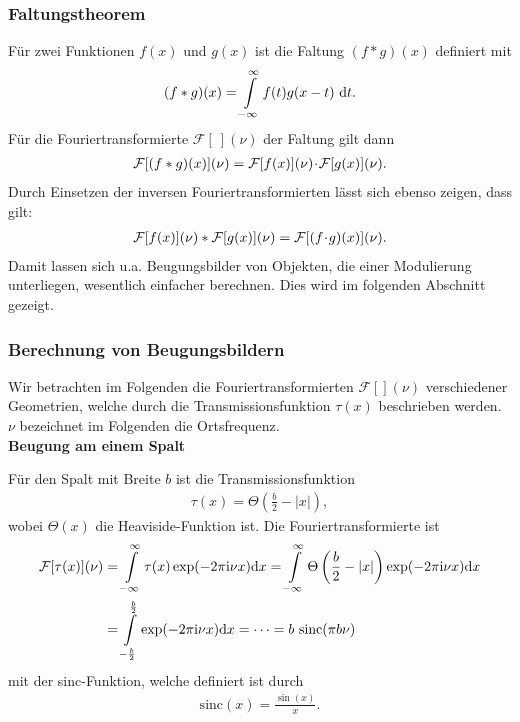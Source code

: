 \subsubsection{Faltungstheorem}
Für zwei Funktionen $f(x)$ und $g(x)$ ist die Faltung $(f*g)(x)$ definiert mit
\begin{align}
(f*g)(x)=\int\limits_{-\infty}^{\infty}f(t)g(x-t)~\mathrm{d} t.
\end{align}
Für die Fouriertransformierte $\mathcal{F}[~](\nu)$ der Faltung gilt dann
\begin{align}
\mathcal{F}[(f*g)(x)](\nu)=\mathcal{F}[f(x)](\nu)\!\cdot\! \mathcal{F}[g(x)](\nu).
\end{align}
Durch Einsetzen der inversen Fouriertransformierten lässt sich ebenso zeigen, dass gilt:
\begin{align}
\mathcal{F}[f(x)](\nu)* \mathcal{F}[g(x)](\nu)=\mathcal{F}[(f\!\cdot\! g)(x)](\nu).
\end{align}
Damit lassen sich u.a. Beugungsbilder von Objekten, die einer Modulierung unterliegen, wesentlich einfacher berechnen. Dies wird im folgenden Abschnitt gezeigt.
\subsubsection{Berechnung von Beugungsbildern}
Wir betrachten im Folgenden die Fouriertransformierten $\mathcal{F}[](\nu)$ verschiedener Geometrien, welche durch die Transmissionsfunktion $\tau(x)$ beschrieben werden.
$\nu$ bezeichnet im Folgenden die Ortsfrequenz.\\

\textbf{Beugung am einem Spalt}

Für den Spalt mit Breite $b$ ist die Transmissionsfunktion
\begin{align}
\tau(x)=\Theta\left(\frac{b}{2}-|x|\right),
\end{align}
wobei $\Theta(x)$ die Heaviside-Funktion ist. Die Fouriertransformierte ist
\begin{align}
\mathcal{F}[\tau(x)](\nu)&=\int\limits_{-\infty}^{\infty}\tau(x)\exp(-2\pi\mathrm{i}\nu x)\mathrm{d} x=\int\limits_{-\infty}^{\infty}\Theta\left(\frac{b}{2}-|x|\right)\exp(-2\pi\mathrm{i}\nu x)\mathrm{d} x\nonumber\\
&=\int\limits_{-\frac{b}{2}}^{\frac{b}{2}}\exp(-2\pi\mathrm{i}\nu x)\mathrm{d} x=
\dots=b~\mathrm{sinc}(\pi b\nu)
\end{align}
mit der sinc-Funktion, welche definiert ist durch
\begin{align}
\mathrm{sinc}(x)=\frac{\sin(x)}{x}.
\end{align}

